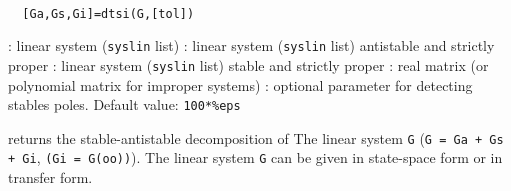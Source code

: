 \begin{mandesc}
   \\ %
\end{mandesc}
\begin{calling_sequence}
\begin{verbatim}
  [Ga,Gs,Gi]=dtsi(G,[tol])   
\end{verbatim}
\end{calling_sequence}
\begin{parameters}
  \begin{varlist}
    : linear system (\verb!syslin! list)
    : linear system (\verb!syslin! list) antistable and strictly proper
    : linear system (\verb!syslin! list) stable and strictly proper
    : real matrix (or polynomial matrix for improper systems)
    : optional parameter for detecting stables poles. Default value: \verb!100*%eps!
  \end{varlist}
\end{parameters}
\begin{mandescription}
  returns the stable-antistable decomposition of
  The linear system \verb!G! (\verb!G = Ga + Gs + Gi!, \verb!(Gi = G(oo))!). 
  The linear system \verb!G! can be given in state-space form or in transfer form.
\end{mandescription}
\begin{manseealso}
       
\end{manseealso}

